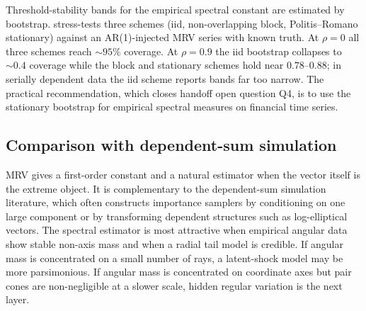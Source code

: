 Threshold-stability bands for the empirical spectral constant are
estimated by bootstrap. 
 stress-tests three
schemes (iid, non-overlapping block, Politis--Romano stationary)
against an AR(1)-injected MRV series with known truth. At $\rho = 0$
all three schemes reach $\sim 95\%$ coverage. At $\rho = 0.9$ the iid
bootstrap collapses to $\sim 0.4$ coverage while the block and
stationary schemes hold near $0.78$--$0.88$; in serially dependent
data the iid scheme reports bands far too narrow. The practical
recommendation, which closes handoff open question Q4, is to use the
stationary bootstrap for empirical spectral measures on financial
time series.

\subsection{Comparison with dependent-sum simulation}

MRV gives a first-order constant and a natural estimator when the vector itself
is the extreme object. It is complementary to the dependent-sum simulation
literature, which often constructs importance samplers by conditioning on one
large component or by transforming dependent structures such as log-elliptical
vectors. The spectral estimator is most attractive when empirical angular data
show stable non-axis mass and when a radial tail model is credible. If angular
mass is concentrated on a small number of rays, a latent-shock model may be more
parsimonious. If angular mass is concentrated on coordinate axes but pair cones
are non-negligible at a slower scale, hidden regular variation is the next
layer.

